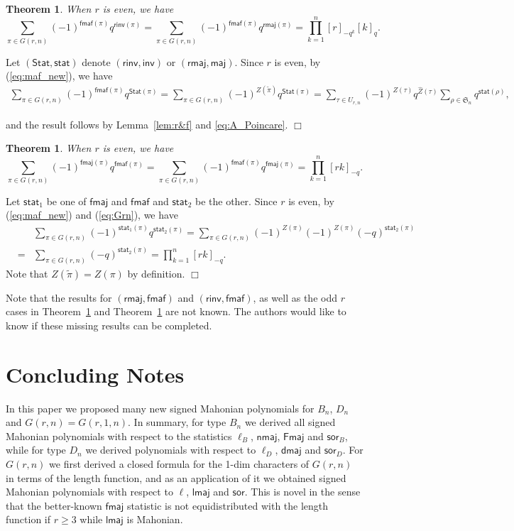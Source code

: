 \documentclass[a4paper, reqno, 11pt]{amsart}
\newtheorem{thm}[lem]{Theorem}
\newcommand{\Stat}{{\textsf{Stat}}}
\newcommand{\stat}{{\textsf{stat}}}
\newcommand{\maj}{{\textsf{maj}}}
\newcommand{\inv}{{\textsf{inv}}}
\newcommand{\fmaj}{{\textsf{fmaj}}}
\newcommand{\Fmaj}{{\textsf{Fmaj}}}
\newcommand{\nmaj}{{\textsf{nmaj}}}
\newcommand{\dmaj}{{\textsf{dmaj}}}
\newcommand{\lmaj}{{\textsf{lmaj}}}
\newcommand{\rmaj}{{\textsf{rmaj}}}
\newcommand{\fmaf}{{\textsf{fmaf}}}
\newcommand{\rinv}{{\textsf{rinv}}}
\newcommand{\sor}{{\textsf{sor}}}
\numberwithin{equation}{section}
\def\proof{\noindent{\bf Proof.\quad}}
\def\qed{\hspace*{\fill} $\Box$ \medskip}
\begin{document}
\begin{thm} \label{thm:fmafrmaj}
When $r$ is even, we have
$$\sum_{\pi\in G(r,n)}(-1)^{\fmaf(\pi)}q^{\rinv(\pi)}=
\sum_{\pi\in G(r,n)}(-1)^{\fmaf(\pi)}q^{\rmaj(\pi)}=\prod_{k=1}^{n}[r]_{-q^k}[k]_q.$$
\end{thm}
\proof
Let $(\Stat,\stat)$ denote $(\rinv,\inv)$ or $(\rmaj,\maj)$.
Since $r$ is even, by (\ref{eq:maf_new}), we have
\begin{align*}
\sum_{\pi\in G(r,n)}(-1)^{\fmaf(\pi)}q^{\Stat(\pi)}
=\sum_{\pi\in G(r,n)}(-1)^{Z(\tilde{\pi})}q^{\Stat(\pi)}
=\sum_{\tau\in U_{r,n}}(-1)^{Z(\tau)}q^{\hat{Z}(\tau)}\sum_{\rho\in \mathfrak{S}_n}q^{\stat(\rho)},
\end{align*}






and the result follows by Lemma~\ref{lem:r&f} and \eqref{eq:A_Poincare}.
\qed

\begin{thm} \label{thm:fmaffmaj}
When $r$ is even, we have
$$\sum_{\pi\in G(r,n)}(-1)^{\fmaj(\pi)}q^{\fmaf(\pi)}
=\sum_{\pi\in G(r,n)}(-1)^{\fmaf(\pi)}q^{\fmaj(\pi)}=\prod_{k=1}^n[rk]_{-q}.$$
\end{thm}
\proof
Let $\stat_1$ be one of $\fmaj$ and $\fmaf$ and $\stat_2$ be the other.
Since $r$ is even, by (\ref{eq:maf_new}) and (\ref{eq:Grn}), we have
\begin{eqnarray*}
&&\sum_{\pi\in G(r,n)}(-1)^{\stat_1(\pi)}q^{\stat_2(\pi)} =\sum_{\pi\in G(r,n)}(-1)^{Z(\pi)}(-1)^{Z(\pi)}(-q)^{\stat_2(\pi)}\\
&=&\sum_{\pi\in G(r,n)}(-q)^{\stat_2(\pi)}=\prod_{k=1}^n[rk]_{-q}.
\end{eqnarray*}
Note that $Z(\tilde{\pi})=Z(\pi)$ by definition. \qed

Note that the results for $(\rmaj, \fmaf)$ and $(\rinv, \fmaf)$, as well as the odd $r$ cases in Theorem~\ref{thm:fmafrmaj} and Theorem~\ref{thm:fmaffmaj} are not known. 
The authors would like to know if these missing results can be completed.






\section{Concluding Notes}\label{sec:summary}
In this paper we proposed many new signed Mahonian polynomials for $B_n$, $D_n$ and $G(r,n)=G(r,1,n)$. 
In summary, for type $B_n$ we derived all signed Mahonian polynomials with respect to the statistics $\ell_B$, $\nmaj$, $\Fmaj$ and $\sor_B$, while for type $D_n$ we derived polynomials with respect to $\ell_D$, $\dmaj$ and $\sor_D$.
For $G(r,n)$ we first derived a closed formula for the 1-dim characters of $G(r,n)$ in terms of the length function, and as an application of it we obtained signed Mahonian polynomials with respect to $\ell$, $\lmaj$ and $\sor$.
This is novel in the sense that the better-known $\fmaj$ statistic is not equidistributed with the length function if $r\ge 3$ while $\lmaj$ is Mahonian. 
\end{document}
